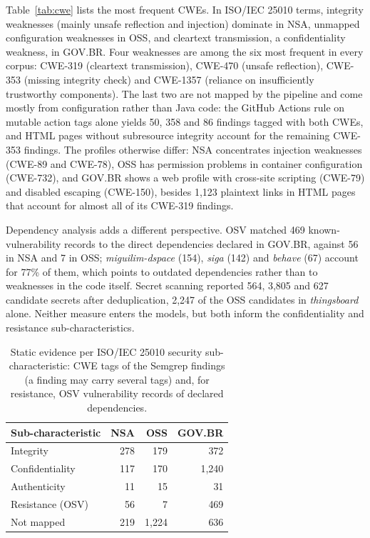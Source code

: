 \documentclass[a4paper,twoside]{article}
\begin{document}
Table~\ref{tab:cwe} lists the most frequent CWEs. In ISO/IEC 25010 terms, integrity weaknesses (mainly unsafe reflection and injection) dominate in NSA, unmapped configuration weaknesses in OSS, and cleartext transmission, a confidentiality weakness, in GOV.BR. Four weaknesses are among the six most frequent in every corpus: CWE-319 (cleartext transmission), CWE-470 (unsafe reflection), CWE-353 (missing integrity check) and CWE-1357 (reliance on insufficiently trustworthy components). The last two are not mapped by the pipeline and come mostly from configuration rather than Java code: the GitHub Actions rule on mutable action tags alone yields 50, 358 and 86 findings tagged with both CWEs, and HTML pages without subresource integrity account for the remaining CWE-353 findings. The profiles otherwise differ: NSA concentrates injection weaknesses (CWE-89 and CWE-78), OSS has permission problems in container configuration (CWE-732), and GOV.BR shows a web profile with cross-site scripting (CWE-79) and disabled escaping (CWE-150), besides 1,123 plaintext links in HTML pages that account for almost all of its CWE-319 findings.

Dependency analysis adds a different perspective. OSV matched 469 known-vulnerability records to the direct dependencies declared in GOV.BR, against 56 in NSA and 7 in OSS; \textit{miguilim-dspace} (154), \textit{siga} (142) and \textit{behave} (67) account for 77\% of them, which points to outdated dependencies rather than to weaknesses in the code itself. Secret scanning reported 564, 3,805 and 627 candidate secrets after deduplication, 2,247 of the OSS candidates in \textit{thingsboard} alone. Neither measure enters the models, but both inform the confidentiality and resistance sub-characteristics.

\begin{table}[t]
\caption{Static evidence per ISO/IEC 25010 security sub-characteristic: CWE tags of the Semgrep findings (a finding may carry several tags) and, for resistance, OSV vulnerability records of declared dependencies.}\label{tab:subchar}
\centering
\footnotesize
\begin{tabular}{@{}lrrr@{}}
\toprule
Sub-characteristic & NSA & OSS & GOV.BR \\
\midrule
Integrity & 278 & 179 & 372 \\
Confidentiality & 117 & 170 & 1,240 \\
Authenticity & 11 & 15 & 31 \\
Resistance (OSV) & 56 & 7 & 469 \\
Not mapped & 219 & 1,224 & 636 \\
\bottomrule
\end{tabular}
\end{table}
\end{document}
